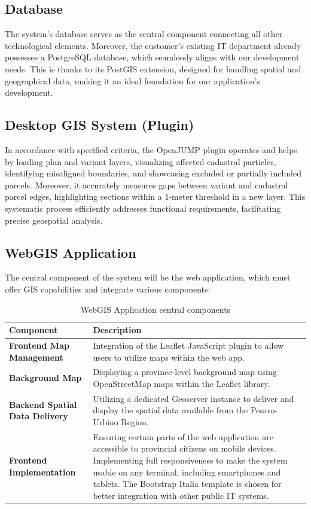 \subsection{Database}\label{subsec:database}
The system's database serves as the central component connecting all other technological elements.
Moreover, the customer's existing IT department already possesses a PostgreSQL database, which seamlessly aligns with our development needs.
This is thanks to its PostGIS extension, designed for handling spatial and geographical data, making it an ideal foundation for our application's development.

\subsection{Desktop GIS System (Plugin)}\label{subsec:openjump-plugin}
In accordance with specified criteria, the OpenJUMP plugin operates and helps by loading plan and variant layers, visualizing affected cadastral particles, identifying misaligned boundaries, and showcasing excluded or partially included parcels.
Moreover, it accurately measures gaps between variant and cadastral parcel edges, highlighting sections within a 1-meter threshold in a new layer.
This systematic process efficiently addresses functional requirements, facilitating precise geospatial analysis.

\subsection{WebGIS Application}\label{subsec:webgis-application}
The central component of the system will be the web application, which must offer GIS capabilities and integrate various components:

\begin{table}[htbp]
    \centering
    \renewcommand{\arraystretch}{1.1}
    \begin{tabular}{|l|p{9cm}|}
        \hline
        \textbf{Component} & \textbf{Description} \\
        \hline
        \textbf{Frontend Map Management} & Integration of the Leaflet JavaScript plugin to allow users to utilize maps within the web app. \\
        \hline
        \textbf{Background Map} & Displaying a province-level background map using OpenStreetMap maps within the Leaflet library. \\
        \hline
        \textbf{Backend Spatial Data Delivery} & Utilizing a dedicated Geoserver instance to deliver and display the spatial data available from the Pesaro-Urbino Region. \\
        \hline
        \textbf{Frontend Implementation} & Ensuring certain parts of the web application are accessible to provincial citizens on mobile devices. Implementing full responsiveness to make the system usable on any terminal, including smartphones and tablets. The Bootstrap Italia template is chosen for better integration with other public IT systems. \\
        \hline
    \end{tabular}
    \caption{WebGIS Application central components \label{tab:table-web-components}}
\end{table}

